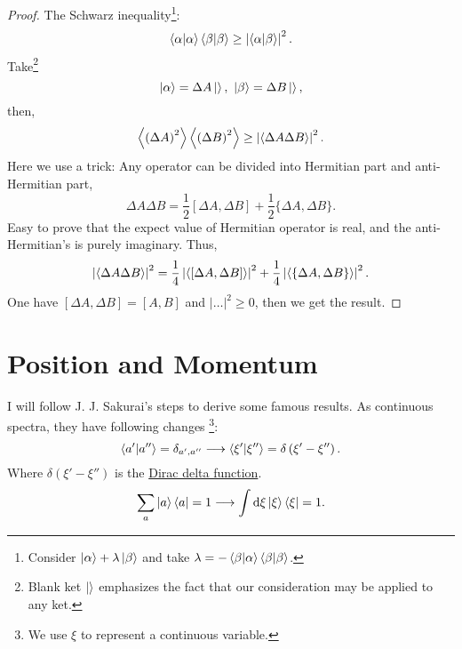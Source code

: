 \documentclass{article}
\theoremstyle{1}
\begin{document}
\begin{proof}
    The Schwarz inequality\footnote{Consider $\ket{\alpha}+\lambda\ket{\beta}$ and take $\lambda=-\braket{\beta}{\alpha}\braket{\beta}{\beta}$.}:
    \begin{equation}
        \braket{\alpha}{\alpha}\braket{\beta}{\beta}\ge \left|\braket{\alpha}{\beta}\right|^2.
    \end{equation}
    Take\footnote{Blank ket $\ket{ }$ emphasizes the fact that our consideration may be applied
to any ket.} $$\ket{\alpha}=\Delta A\ket{ },\ \ket{\beta}=\Delta B \ket{ },$$
then, 
\begin{equation}
    \expval{\left(\Delta A\right)^2}\expval{\left(\Delta B\right)^2}\ge\left|\expval{\Delta A\Delta B}\right|^2.
\end{equation}
Here we use a trick: Any operator can be divided into Hermitian part and anti-Hermitian part, 
\begin{equation}
    \Delta A \Delta B=\frac{1}{2}[\Delta A, \Delta B ]+\frac{1}{2}\{\Delta A,\Delta B\}.
\end{equation}
Easy to prove that the expect value of Hermitian operator is real, and the anti-Hermitian's is purely imaginary. Thus,
\begin{equation}
    \left|\expval{\Delta A\Delta B}\right|^2=\frac{1}{4}\left|\expval{[\Delta A,\Delta B]}\right|^2+\frac{1}{4}\left|\expval{\{\Delta A,\Delta B\}}\right|^2.
\end{equation}
One have $[\Delta A,\Delta B]=[A,B]$ and $\left|\dots\right|^2\ge 0$, then we get the result.
\end{proof}

\section{Position and Momentum}
\quad I will follow J. J. Sakurai's steps to derive some famous results. As continuous spectra, they have following changes \footnote{We use $\xi $ to represent a continuous variable.}:
\begin{equation}
    \braket{a'}{a''}=\delta_{a',a''}\longrightarrow \braket{\xi'}{\xi''}=\delta\left(\xi'-\xi''\right).
\end{equation}
Where $\delta\left(\xi'-\xi''\right)$ is the \href{run:Dirac delta function.pdf alias}{Dirac delta function}.
\begin{equation}
    \sum_{a}\ket{a}\bra{a}=1\longrightarrow \int \dd{\xi} \ket{\xi}\bra{\xi}=1.
\end{equation}
\end{document}
